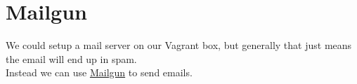 \section{Mailgun}

We could setup a mail server on our Vagrant box, but generally that just means the email will end up in spam.
\\

Instead we can use \href{https://www.mailgun.com/}{Mailgun} to send emails.
